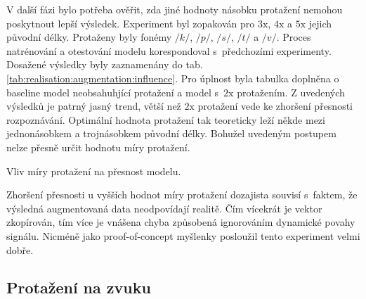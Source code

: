 V další fázi bylo potřeba ověřit, zda jiné hodnoty násobku protažení nemohou poskytnout lepší výsledek.
Experiment byl zopakován pro $3\mathrm{x}$, $4\mathrm{x}$ a $5\mathrm{x}$ jejich původní délky.
Protaženy byly fonémy $/k/$, $/p/$, $/s/$, $/t/$ a $/v/$.
Proces natrénování a otestování modelu korespondoval s~předchozími experimenty.
Dosažené výsledky byly zaznamenány do tab. \ref{tab:realisation:augmentation:influence}.
Pro úplnost byla tabulka doplněna o baseline model neobsahuhjící protažení a model s~$2\mathrm{x}$ protažením.
Z uvedených výsledků je patrný jasný trend, větší než $2\mathrm{x}$ protažení vede ke zhoršení přesnosti rozpoznávání.
Optimální hodnota protažení tak teoreticky leží někde mezi jednonásobkem a trojnásobkem původní délky.
Bohužel uvedeným postupem nelze přesně určit hodnotu míry protažení.

\begin{table}[htpb]
  \centering
  \def\arraystretch{1.5}
  \caption{Vliv míry protažení na přesnost modelu.}
  \label{tab:realisation:augmentation:influence}
\end{table}

Zhoršení přesnosti u vyšších hodnot míry protažení dozajista souvisí s~faktem, že výsledná augmentovaná data neodpovídají realitě. Čím vícekrát je vektor zkopírován, tím více je vnášena chyba způsobená ignorováním dynamické povahy signálu. Nicméně jako proof-of-concept myšlenky posloužil tento experiment velmi dobře.

\subsection{Protažení na zvuku}
\label{chap:realisation:augmentation:audio}

